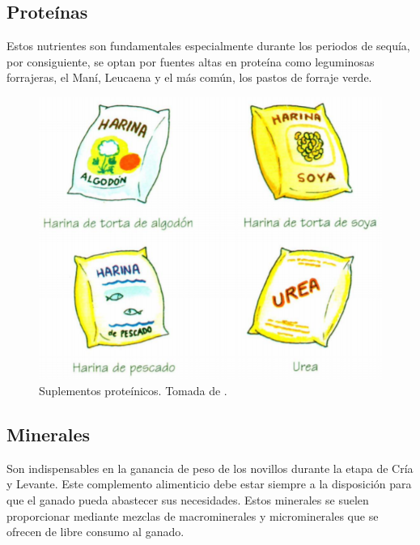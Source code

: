 \subsection{Proteínas}
Estos nutrientes son fundamentales especialmente durante los periodos de sequía, por consiguiente, se optan por fuentes altas en proteína como leguminosas forrajeras, el Maní, Leucaena y el más común, los pastos de forraje verde. 
	\begin{figure}[H]
	 \begin{center}
	 \includegraphics[scale=0.8]{img/proteina.png}
	 \end{center}
	 \caption{Suplementos proteínicos. Tomada de \cite{librito1}. \label{proteinaspng}}
	\end{figure}

\subsection{Minerales}
Son indispensables en la ganancia de peso de los novillos durante la etapa de Cría y Levante. Este complemento alimenticio debe estar siempre a la disposición para que el ganado pueda abastecer sus necesidades. Estos minerales se suelen proporcionar mediante mezclas de macrominerales y microminerales que se ofrecen de libre consumo al ganado.


